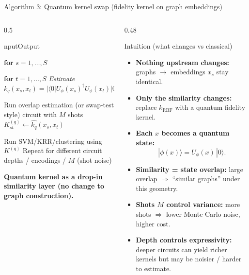 \documentclass[aspectratio=169,xcolor={dvipsnames}]{beamer}
\renewcommand{\accent}[1]{\textbf{#1}}
\newenvironment{algorithm}[1][]{\begin{center}\begin{minipage}{0.95\linewidth}\small}{\end{minipage}\end{center}}
\newcommand{\DontPrintSemicolon}{}
\newcommand{\SetAlgoLined}{}
\newcommand{\SetKwInOut}[2]{\expandafter\newcommand\csname #1\endcsname[1]{\par\textbf{#2:} ##1\par}}
\newcommand{\BlankLine}{\par\smallskip}
\newcommand{\For}[2]{\par\textbf{for} #1 #2\par}
\newcommand{\tcp}[1]{\emph{#1}\par}
\renewcommand{\caption}[1]{\par\smallskip\textbf{#1}\par}
\begin{document}
\begin{frame}[fragile, shrink=30]{Algorithm 3: Quantum kernel swap (fidelity kernel on graph embeddings)}
    \small
    \begin{columns}[T,onlytextwidth]
    \begin{column}{0.5\textwidth}
    \begin{algorithm}[H]
    \DontPrintSemicolon
    \SetAlgoLined
    \SetKwInOut{Input}{Input}\SetKwInOut{Output}{Output}


    \BlankLine
    \For{$s=1,\dots,S$}{
    \For{$t=1,\dots,S$}{
    \tcp{Estimate $k_q(x_s,x_t)=|\langle 0|U_\phi(x_s)^\dagger U_\phi(x_t)|0\rangle|^2$}
    Run overlap estimation (or swap-test style) circuit with $M$ shots\;
    $K^{(q)}_{st}\leftarrow \widehat{k_q}(x_s,x_t)$\;
    }}
    Run SVM/KRR/clustering using $K^{(q)}$\;
    Repeat for different circuit depths / encodings / $M$ (shot noise)\;
    \caption{Quantum kernel as a drop-in similarity layer (no change to graph construction).}
    \end{algorithm}
    \end{column}

    \begin{column}{0.48\textwidth}
    \begin{block}{Intuition (what changes vs classical)}
    \footnotesize
    \begin{itemize}\setlength\itemsep{4pt}
    \item \accent{Nothing upstream changes:} graphs $\to$ embeddings $x_s$ stay identical.
    \item \accent{Only the similarity changes:} replace $k_{\text{RBF}}$ with a quantum fidelity kernel.
    \item \accent{Each $x$ becomes a quantum state:}
    \[
    |\phi(x)\rangle = U_\phi(x)\,|0\rangle.
    \]
    \item \accent{Similarity = state overlap:} large overlap $\Rightarrow$ “similar graphs” under this geometry.
    \item \accent{Shots $M$ control variance:}
    more shots $\Rightarrow$ lower Monte Carlo noise, higher cost.
    \item \accent{Depth controls expressivity:}
    deeper circuits can yield richer kernels but may be noisier / harder to estimate.
    \end{itemize}
    \end{block}


\end{column}
\end{columns}
\end{frame}
\end{document}
